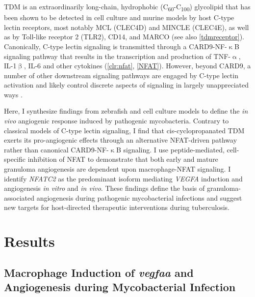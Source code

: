 TDM is an extraordinarily long\hyp{}chain, hydrophobic (C\textsubscript{60}\hyp{}C\textsubscript{100}) glycolipid \citep{Noll1956a, Noll1956b, Hunter2006a, Behling1993} that has been shown to be detected in cell culture and murine models by host C\hyp{}type lectin receptors, most notably MCL (CLEC4D) and MINCLE (CLEC4E), as well as by Toll\hyp{}like receptor 2 (TLR2), CD14, and MARCO \citep{Bowdish2009, Matsunaga2009, Miyake2013, Ishikawa2009} (see also \autoref{tdmreceptor}). Canonically, C\hyp{}type lectin signaling is transmitted through a CARD9\hyp{}NF\hyp{}$\upkappa$B signaling pathway that results in the transcription and production of TNF\hyp{}$\upalpha$, IL\hyp{}1$\upbeta$, IL\hyp{}6 and other cytokines \citep{Yamasaki2008, Goodridge2009, LobatoPascual2013, Zhao2014, Deerhake2021} (\autoref{clr:nfat}, \autoref{NFAT}). However, beyond CARD9, a number of other downstream signaling pathways are engaged by C\hyp{}type lectin activation and likely control discrete aspects of signaling in largely unappreciated ways \citep{Goodridge2007, Deerhake2021}.

Here, I synthesize findings from zebrafish and cell culture models to define the \textit{in vivo} angiogenic response induced by pathogenic mycobacteria. Contrary to classical models of C\hyp{}type lectin signaling, I find that cis\hyp{}cyclopropanated TDM exerts its pro\hyp{}angiogenic effects through an alternative NFAT\hyp{}driven pathway rather than canonical CARD9\hyp{}NF\hyp{}$\upkappa$B signaling. I use peptide\hyp{}mediated, cell\hyp{}specific inhibition of NFAT to demonstrate that both early and mature granuloma angiogenesis are dependent upon macrophage\hyp{}NFAT signaling. I identify \textit{NFATC2} as the predominant isoform mediating \textit{VEGFA} induction and angiogenesis \textit{in vitro} and \textit{in vivo}. These findings define the basis of granuloma\hyp{}associated angiogenesis during pathogenic mycobacterial infections and suggest new targets for host\hyp{}directed therapeutic interventions during tuberculosis.

\section{Results}

\subsection{Macrophage Induction of \textit{vegfaa} and Angiogenesis during Mycobacterial Infection}\label{extracellular}

